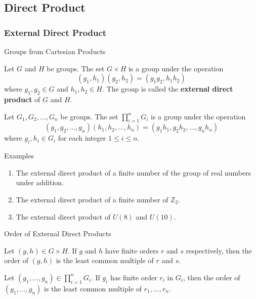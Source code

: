 \documentclass{beamer}
\begin{document}
\subsection{Direct Product}

\subsubsection{External Direct Product}

\begin{frame}{Groups from Cartesian Products}
    \begin{theorem}
        \justifying
        Let $G$ and $H$ be groups. The set $G \times H$ is a group under the operation
        \[(g_1,h_1)(g_2, h_2) = (g_1g_2, h_1h_2)\]
        where $g_1, g_2 \in G$ and $h_1, h_2 \in H$. The group is called the \textbf{external direct product} of $G$ and $H$.
    \end{theorem}
    \pause
    \begin{corollary}
        \justifying
        Let $G_1, G_2, \dots, G_n$ be groups. The set $\prod_{i=1}^nG_i$ is a group under the operation
        \[(g_1,g_2,\dots,g_n)(h_1, h_2, \dots, h_n) = (g_1h_1, g_2h_2, \dots, g_nh_n)\]
        where $g_i, h_i \in G_i$ for each integer $1\leq i \leq n$.
    \end{corollary}
\end{frame}

\begin{frame}{Examples}
    \begin{enumerate}
        \item The external direct product of a finite number of the group of real numbers under addition.
        \item The external direct product of a finite number of $\mathbb{Z}_2$.
        \item The external direct product of $U(8)$ and $U(10)$.
    \end{enumerate}
\end{frame}

\begin{frame}{Order of External Direct Products}
    \begin{theorem}
        \justifying
        Let $(g, h) \in G \times H$. If $g$ and $h$ have finite orders $r$ and $s$ respectively, then the order of $(g, h)$ is the least common multiple of $r$ and $s$.
    \end{theorem}
    \pause
    \begin{corollary}
        \justifying
        Let $(g_1, \dots, g_n) \in \prod_{i=1}^nG_i$. If $g_i$ has finite order $r_i$ in $G_i$, then the order of $(g_1,\dots,g_n)$ is the least common multiple of $r_1, \dots, r_n$. 
    \end{corollary}
\end{frame}
\end{document}
